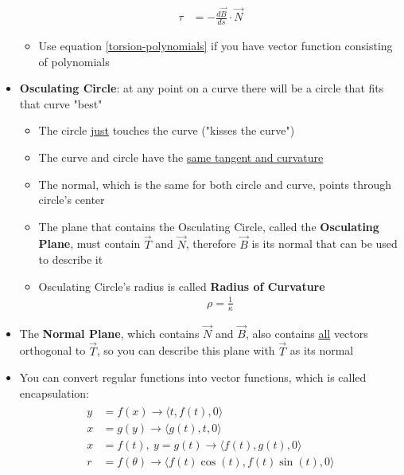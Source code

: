\documentclass{article}
\begin{document}
\begin{itemize}
\begin{align}
    \tau &= -\frac{d\vec{B}}{ds}\cdot\vec{N}
  \end{align}
  \begin{itemize}
    \item Use equation \ref{torsion-polynomials} if you have vector function consisting of polynomials
  \end{itemize}
  \item \textbf{Osculating Circle}: at any point on a curve there will be a circle that fits that curve "best"
  \begin{itemize}
    \item The circle \underline{just} touches the curve ("kisses the curve")
    \item The curve and circle have the \underline{same tangent and curvature}
    \item The normal, which is the same for both circle and curve, points through circle's center
    \item The plane that contains the Osculating Circle, called the \textbf{Osculating Plane}, must contain $\vec{T}$ and $\vec{N}$, therefore $\vec{B}$ is its normal that can be used to describe it
    \item Osculating Circle's radius is called \textbf{Radius of Curvature}
    \begin{align}
      \rho = \frac{1}{\kappa}
    \end{align}
  \end{itemize}
  \item The \textbf{Normal Plane}, which contains $\vec{N}$ and $\vec{B}$, also contains \underline{all} vectors orthogonal to $\vec{T}$, so you can describe this plane with $\vec{T}$ as its normal
  \item You can convert regular functions into vector functions, which is called encapsulation:
  \begin{align}
    \begin{split}
      y &= f(x) \rightarrow \langle t, f(t), 0 \rangle \\
      x &= g(y) \rightarrow \langle g(t), t, 0 \rangle \\
      x &= f(t), \ y = g(t) \rightarrow \langle f(t), g(t), 0 \rangle \\
      r &= f(\theta) \rightarrow \langle f(t)\cos(t), f(t)\sin(t), 0 \rangle
    \end{split}
  \end{align}
\end{itemize}
\end{document}
